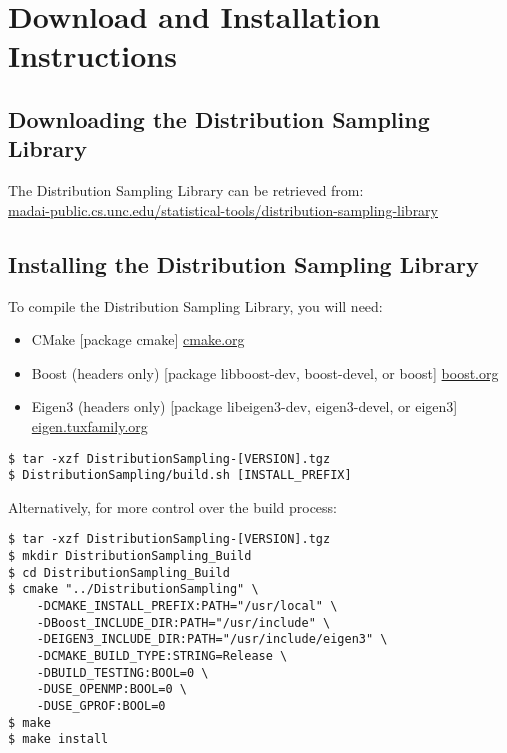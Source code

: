 \section{Download and Installation Instructions}

\subsection{Downloading the Distribution Sampling Library}

The Distribution Sampling Library can be retrieved from: \\
\href{https://madai-public.cs.unc.edu/statistical-tools/distribution-sampling-library/}{madai-public.cs.unc.edu/statistical-tools/distribution-sampling-library}

\subsection{Installing the Distribution Sampling Library}

To compile the Distribution Sampling Library, you will need:
\begin{itemize}
\item CMake [package cmake] \href{http://www.cmake.org/cmake/resources/software.html}{cmake.org}
\item Boost (headers only) [package libboost-dev, boost-devel, or boost] \href{http://www.boost.org/users/download/}{boost.org}
\item Eigen3 (headers only) [package libeigen3-dev, eigen3-devel, or eigen3]
\href{http://eigen.tuxfamily.org/}{eigen.tuxfamily.org}
\end{itemize}

\begin{verbatim}
$ tar -xzf DistributionSampling-[VERSION].tgz
$ DistributionSampling/build.sh [INSTALL_PREFIX]
\end{verbatim}

Alternatively, for more control over the build process:

\begin{verbatim}
$ tar -xzf DistributionSampling-[VERSION].tgz
$ mkdir DistributionSampling_Build
$ cd DistributionSampling_Build
$ cmake "../DistributionSampling" \
    -DCMAKE_INSTALL_PREFIX:PATH="/usr/local" \
    -DBoost_INCLUDE_DIR:PATH="/usr/include" \
    -DEIGEN3_INCLUDE_DIR:PATH="/usr/include/eigen3" \
    -DCMAKE_BUILD_TYPE:STRING=Release \
    -DBUILD_TESTING:BOOL=0 \
    -DUSE_OPENMP:BOOL=0 \
    -DUSE_GPROF:BOOL=0
$ make
$ make install
\end{verbatim}




